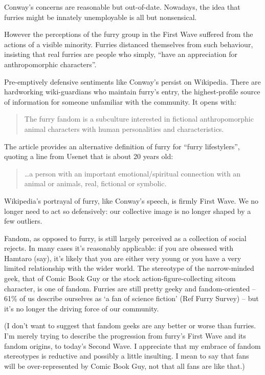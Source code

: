 Conway's concerns are reasonable but out-of-date. Nowadays, the idea that furries might be innately unemployable is all but nonsensical.

However the perceptions of the furry group in the First Wave suffered from the actions of a visible minority. Furries distanced themselves from such behaviour, insisting that real furries are people who simply, ``have an appreciation for anthropomorphic characters''.

Pre-emptively defensive sentiments like Conway's persist on Wikipedia. There are hardworking wiki-guardians who maintain furry's entry, the highest-profile source of information for someone unfamiliar with the community. It opens with:

\begin{quote}
  The furry fandom is a subculture interested in fictional anthropomorphic animal characters with human personalities and characteristics.
\end{quote}

The article provides an alternative definition of furry for ``furry lifestylers'', quoting a line from Usenet that is about 20 years old:

\begin{quote}
  \ldots a person with an important emotional/spiritual connection with an animal or animals, real, fictional or symbolic.
\end{quote}

Wikipedia's portrayal of furry, like Conway's speech, is firmly First Wave. We no longer need to act so defensively: our collective image is no longer shaped by a few outliers.

Fandom, as opposed to furry, is still largely perceived as a collection of social rejects. In many cases it's reasonably applicable: if you are obsessed with Hamtaro (say), it's likely that you are either very young or you have a very limited relationship with the wider world. The stereotype of the narrow-minded geek, that of Comic Book Guy or the stock action-figure-collecting sitcom character, is one of fandom. Furries are still pretty geeky and fandom-oriented -- 61\% of us describe ourselves as `a fan of science fiction' (Ref Furry Survey) -- but it's no longer the driving force of our community.

(I don't want to suggest that fandom geeks are any better or worse than furries. I'm merely trying to describe the progression from furry's First Wave and its fandom origins, to today's Second Wave. I appreciate that my embrace of fandom stereotypes is reductive and possibly a little insulting. I mean to say that fans will be over-represented by Comic Book Guy, not that all fans are like that.)

